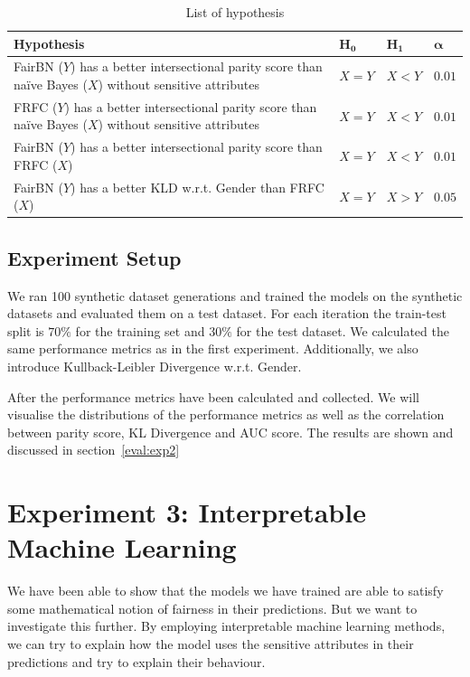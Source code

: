 \begin{table}
    \centering
    \begin{tabular}{p{10cm}lll}
        \hline
        \textbf{Hypothesis} & $\boldsymbol{H_0}$ & $\boldsymbol{H_1}$ & $\boldsymbol{\alpha}$ \\
        \hline
        \hline
        FairBN ($Y$) has a better intersectional parity score than naïve Bayes ($X$) without sensitive attributes & $X = Y$ & $X < Y$ & $0.01$ \\ \hline
        FRFC ($Y$) has a better intersectional parity score than naïve Bayes ($X$) without sensitive attributes & $X = Y$ & $X < Y$ & $0.01$ \\ \hline
        FairBN ($Y$) has a better intersectional parity score than FRFC ($X$) & $X = Y$ & $X < Y$ & $0.01$ \\ \hline
        FairBN ($Y$) has a better KLD w.r.t. Gender than FRFC ($X$) & $X = Y$ & $X > Y$ & $0.05$ \\ \hline
    \end{tabular}
    \caption{List of hypothesis}
    \label{tab:hypothesis}
\end{table}

\subsection{Experiment Setup}

We ran 100 synthetic dataset generations and trained the models on the synthetic datasets and evaluated them on a test dataset. For each iteration the train-test split is $70\%$ for the training set and $30\%$ for the test dataset. We calculated the same performance metrics as in the first experiment. Additionally, we also introduce Kullback-Leibler Divergence w.r.t. Gender. 

After the performance metrics have been calculated and collected. We will visualise the distributions of the performance metrics as well as the correlation between parity score, KL Divergence and AUC score. The results are shown and discussed in section~\ref{eval:exp2}

\section{Experiment 3: Interpretable Machine Learning}

We have been able to show that the models we have trained are able to satisfy some mathematical notion of fairness in their predictions. But we want to investigate this further. By employing interpretable machine learning methods, we can try to explain how the model uses the sensitive attributes in their predictions and try to explain their behaviour. 


